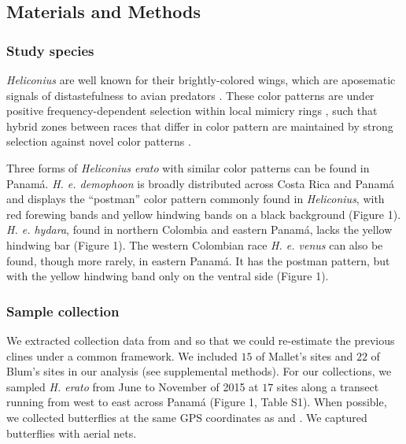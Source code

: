 \documentclass[]{article}
\begin{document}
\subsection{Materials and Methods}\label{materials-and-methods}

\subsubsection{Study species}\label{study-species}

\textit{Heliconius} are well known for their brightly-colored wings,
which are aposematic signals of distastefulness to avian predators
\citep{Supple:2014ff}. These color patterns are under positive
frequency-dependent selection within local mimicry rings
\citep{Merrill:2012gt, Chouteau:2016kk}, such that hybrid zones between
races that differ in color pattern are maintained by strong selection
against novel color patterns
\citep{Benson:1972hq, Mallet1989a, Kapan2001}.

Three forms of \textit{Heliconius erato} with similar color patterns can
be found in Panamá. \textit{H. e. demophoon} is broadly distributed
across Costa Rica and Panamá and displays the ``postman'' color pattern
commonly found in \textit{Heliconius}, with red forewing bands and
yellow hindwing bands on a black background (Figure 1).
\textit{H. e. hydara}, found in northern Colombia and eastern Panamá,
lacks the yellow hindwing bar (Figure 1). The western Colombian race
\textit{H. e. venus} can also be found, though more rarely, in eastern
Panamá. It has the postman pattern, but with the yellow hindwing band
only on the ventral side (Figure 1).

\subsubsection{Sample collection}\label{sample-collection}

We extracted collection data from \citet{Mallet:1986vj} and
\citet{Blum:2002wr} so that we could re-estimate the previous clines
under a common framework. We included \(15\) of Mallet's sites and
\(22\) of Blum's sites in our analysis (see supplemental methods). For
our collections, we sampled \textit{H. erato} from June to November of
2015 at \(17\) sites along a transect running from west to east across
Panamá (Figure 1, Table S1). When possible, we collected butterflies at
the same GPS coordinates as \citet{Mallet:1986vj} and
\citet{Blum:2002wr}. We captured butterflies with aerial nets.
\end{document}
